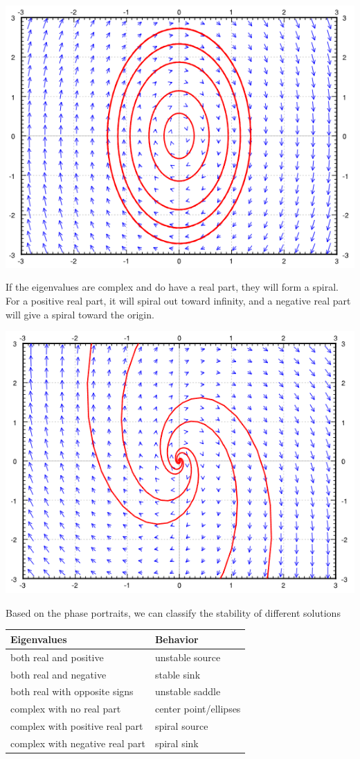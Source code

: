 \documentclass[11pt, fleqn]{article}
\begin{document}
\centerline{\includegraphics[scale=0.8]{ODEPictures/phasePortrait4.png}}
If the eigenvalues are complex and do have a real part, they will form a spiral. For a positive real part, it will spiral out toward infinity, and a negative real part will give a spiral toward the origin.\\
\centerline{\includegraphics[scale=0.8]{ODEPictures/phasePortrait5.png}}
Based on the phase portraits, we can classify the stability of different solutions\\
\begin{tabular}{l|l}
    Eigenvalues & Behavior\\
    \hline
     both real and positive & unstable source\\
    both real and negative & stable sink\\
    both real with opposite signs & unstable saddle\\
    complex with no real part & center point/ellipses\\
    complex with positive real part & spiral source\\
    complex with negative real part & spiral sink
\end{tabular}
\end{document}
